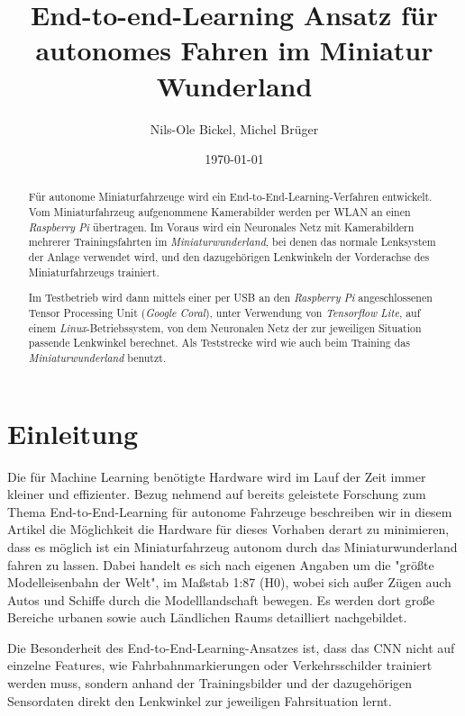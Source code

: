 \documentclass[a4paper, 12pt]{scrartcl}
\title{End-to-end-Learning Ansatz für autonomes Fahren im Miniatur Wunderland}
\author{Nils-Ole Bickel, Michel Brüger}
\date{\today}
\begin{document}
	
\maketitle



\begin{abstract}	
Für autonome Miniaturfahrzeuge wird ein End-to-End-Learning-Verfahren entwickelt. Vom Miniaturfahrzeug aufgenommene Kamerabilder werden per WLAN an einen \emph{Raspberry Pi} übertragen. Im Voraus wird ein Neuronales Netz mit Kamerabildern mehrerer Trainingsfahrten im \emph{Miniaturwunderland}, bei denen das normale Lenksystem der Anlage verwendet wird, und den dazugehörigen Lenkwinkeln der Vorderachse des Miniaturfahrzeugs trainiert. 

Im Testbetrieb wird dann mittels einer per USB an den \emph{Raspberry Pi} angeschlossenen Tensor Processing Unit (\emph{Google Coral}), unter Verwendung von \emph{Tensorflow Lite}, auf einem \emph{Linux}-Betriebssystem, von dem Neuronalen Netz der zur jeweiligen Situation passende Lenkwinkel berechnet.
Als Teststrecke wird wie auch beim Training das \emph{Miniaturwunderland} benutzt.
\end{abstract}
	


\newpage
	
	\section{Einleitung}
	Die für Machine Learning benötigte Hardware wird im Lauf der Zeit immer kleiner und effizienter. Bezug nehmend auf bereits geleistete Forschung zum Thema End-to-End-Learning für autonome Fahrzeuge \cite{article} beschreiben wir in diesem Artikel die Möglichkeit die Hardware für dieses Vorhaben derart zu minimieren, dass es möglich ist ein Miniaturfahrzeug \cite{article2} autonom durch das Miniaturwunderland fahren zu lassen. Dabei handelt es sich nach eigenen Angaben um die "größte Modelleisenbahn der Welt", im Maßstab 1:87 (H0), wobei sich außer Zügen auch Autos und Schiffe durch die Modelllandschaft bewegen. Es werden dort große Bereiche urbanen sowie auch Ländlichen Raums detailliert nachgebildet.
	
	 Die Besonderheit des End-to-End-Learning-Ansatzes ist, dass das CNN nicht auf einzelne Features, wie Fahrbahnmarkierungen oder Verkehrsschilder trainiert werden muss, sondern anhand der Trainingsbilder und der dazugehörigen Sensordaten direkt den Lenkwinkel zur jeweiligen Fahrsituation lernt. 
\end{document}
